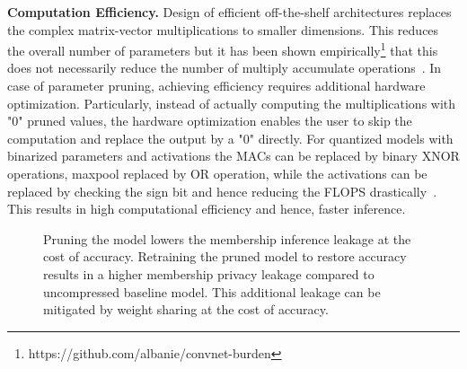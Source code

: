\noindent\textbf{Computation Efficiency.} Design of efficient off-the-shelf architectures replaces the complex matrix-vector multiplications to smaller dimensions.
This reduces the overall number of parameters but it has been shown empirically\footnote{https://github.com/albanie/convnet-burden} that this does not necessarily reduce the number of multiply accumulate operations~\cite{article}.
In case of parameter pruning, achieving efficiency requires additional hardware optimization. Particularly, instead of actually computing the multiplications with "0" pruned values, the hardware optimization enables the user to skip the computation and replace the output by a "0" directly.
For quantized models with binarized parameters and activations the MACs can be replaced by binary XNOR operations, maxpool replaced by OR operation, while the activations can be replaced by checking the sign bit and hence reducing the FLOPS drastically~\cite{235489}.
This results in high computational efficiency and hence, faster inference.

\begin{figure}[!htb]
    \centering

\hspace{4mm}
\hspace{4mm}
    \caption{Pruning the model lowers the membership inference leakage at the cost of accuracy. Retraining the pruned model to restore accuracy results in a higher membership privacy leakage compared to uncompressed baseline model. This additional leakage can be mitigated by weight sharing at the cost of accuracy.}
    \label{fig:NIAcause}
\end{figure}



